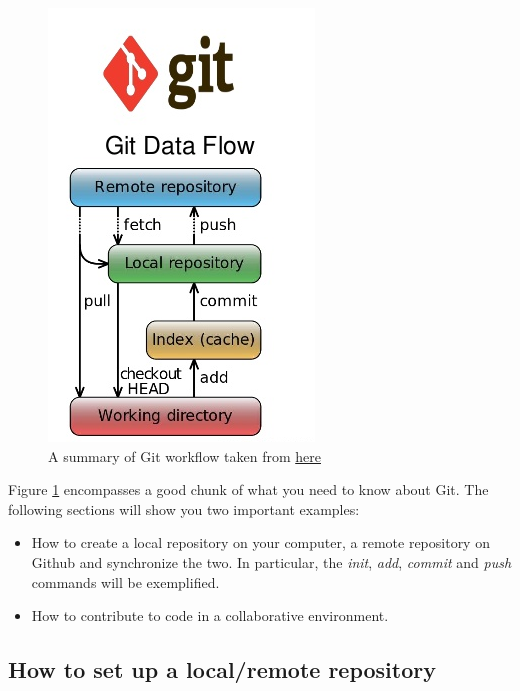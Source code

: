 \documentclass{report}
\begin{document}
\begin{figure}[H]
\centering
\includegraphics[scale=0.6]{git_workflow}
\caption{A summary of Git workflow taken from \href{http://www.slideshare.net/VinothKumarKannan/svn-vs-mercurial-vs-github}{here} }
\label{fig:git_workflow}
\end{figure}
Figure \ref{fig:git_workflow} encompasses a good chunk of what you need to know about Git. The following sections will show you two important examples:
\begin{itemize}
\item [1.] How to create a local repository on your computer, a remote repository on Github and synchronize the two. In particular, the \textit{init}, \textit{add}, \textit{commit} and \textit{push} commands will be exemplified. 
\item [2.] How to contribute to code in a collaborative environment.
\end{itemize}
\subsection{How to set up a local/remote repository}
\end{document}
